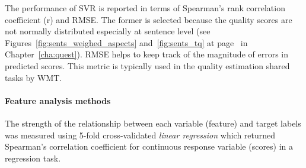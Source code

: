 The performance of \gls{SVR} is reported in terms of Spearman's rank correlation coefficient (r) and \gls{RMSE}. The former is selected because the quality scores are not normally distributed especially at sentence level (see Figures~\ref{fig:sents_weighed_aspects} and~\ref{fig:sents_tq} at page~\pageref{pg:skews} in Chapter~\ref{cha:quest}). \gls{RMSE} helps to keep track of the magnitude of errors in predicted scores. This metric is typically used in the quality estimation shared tasks by \gls{WMT}.

\paragraph{Feature analysis methods}
The strength of the relationship between each variable (feature) and target labels was measured using 5-fold cross-validated \textit{linear regression} which returned Spearman's correlation coefficient for continuous response variable (scores) in a regression task. 







